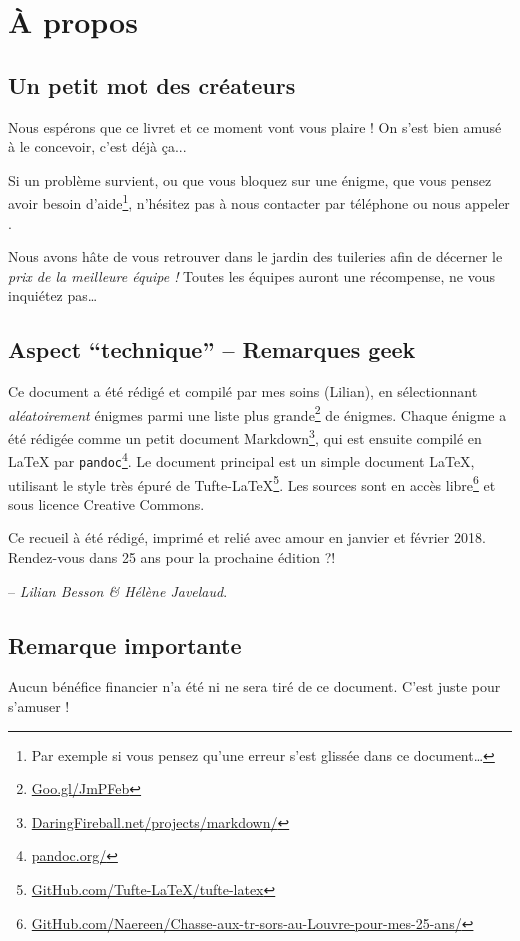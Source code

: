 \chapter{À propos}

\section*{Un petit mot des créateurs}

Nous espérons que ce livret et ce moment vont vous plaire !
On s'est bien amusé à le concevoir, c'est déjà ça...

Si un problème survient, ou que vous bloquez sur une énigme, que vous pensez avoir besoin d'aide\footnote{Par exemple si vous pensez qu'une erreur s'est glissée dans ce document…}, n'hésitez pas à nous contacter par téléphone ou nous appeler
.

Nous avons hâte de vous retrouver dans le jardin des tuileries afin de décerner le \emph{prix de la meilleure équipe !}
Toutes les équipes auront une récompense, ne vous inquiétez pas…


\section*{Aspect ``technique'' -- Remarques geek}
Ce document a été rédigé et compilé par mes soins (Lilian), en sélectionnant \emph{aléatoirement} \nbenigmes{} énigmes parmi une liste plus grande\footnote{\url{Goo.gl/JmPFeb}} de \totalnbenigmes{} énigmes.
%
Chaque énigme a été rédigée comme un petit document Markdown\footnote{\url{DaringFireball.net/projects/markdown/}},
qui est ensuite compilé en \LaTeX{} par \texttt{pandoc}\footnote{\url{pandoc.org/}}.
%
Le document principal est un simple document \LaTeX,
utilisant le style très épuré de Tufte-\LaTeX{}\footnote{\url{GitHub.com/Tufte-LaTeX/tufte-latex}}.
%
Les sources sont en accès libre\footnote{\url{GitHub.com/Naereen/Chasse-aux-tr-sors-au-Louvre-pour-mes-25-ans/}} et sous licence Creative Commons.

Ce recueil à été rédigé, imprimé et relié avec amour en janvier et février 2018.
Rendez-vous dans 25 ans pour la prochaine édition ?!

\hfill{} -- \emph{Lilian Besson \& Hélène Javelaud}.

\section*{Remarque importante}
Aucun bénéfice financier n'a été ni ne sera tiré de ce document.
C'est juste pour s'amuser !
